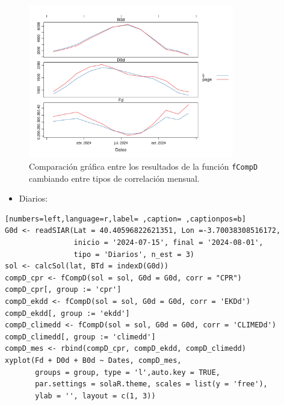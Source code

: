 \begin{itemize}
\begin{itemize}
\begin{figure}[!htb]
\centering
\includegraphics[width=0.8\textwidth]{figuras/codigo-fcompdmes.pdf}
\caption{Comparación gráfica entre los resultados de la función \texttt{fCompD} cambiando entre tipos de correlación mensual.}
\end{figure}
\begin{itemize}
\item Diarios:
\end{itemize}
\begin{lstlisting}[numbers=left,language=r,label= ,caption= ,captionpos=b]
G0d <- readSIAR(Lat = 40.40596822621351, Lon =-3.70038308516172,
                inicio = '2024-07-15', final = '2024-08-01',
                tipo = 'Diarios', n_est = 3)
sol <- calcSol(lat, BTd = indexD(G0d))
compD_cpr <- fCompD(sol = sol, G0d = G0d, corr = "CPR")
compD_cpr[, group := 'cpr']
compD_ekdd <- fCompD(sol = sol, G0d = G0d, corr = 'EKDd')
compD_ekdd[, group := 'ekdd']
compD_climedd <- fCompD(sol = sol, G0d = G0d, corr = 'CLIMEDd')
compD_climedd[, group := 'climedd']
compD_mes <- rbind(compD_cpr, compD_ekdd, compD_climedd)
xyplot(Fd + D0d + B0d ~ Dates, compD_mes,
       groups = group, type = 'l',auto.key = TRUE,
       par.settings = solaR.theme, scales = list(y = 'free'),
       ylab = '', layout = c(1, 3))
\end{lstlisting}


\end{itemize}
\end{itemize}

